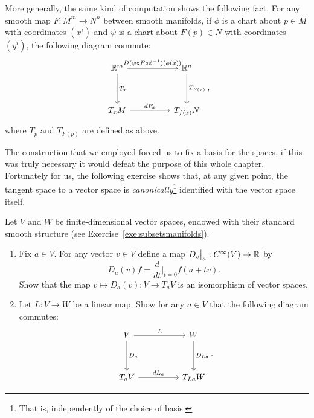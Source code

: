 More generally, the same kind of computation shows the following fact. For any smooth map $F:M^m \to N^n$ between smooth manifolds, if $\phi$ is a chart about $p\in M$ with coordinates $(x^i)$ and $\psi$ is a chart about $F(p)\in N$ with coordinates $(y^i)$, the following diagram commute:
\begin{equation}
    \begin{tikzcd}[row sep=huge, column sep=huge]
        \R^m \arrow[r, "D(\psi \circ F \circ \phi^{-1})(\phi(x))"] \arrow[d, "T_x"]
        & \R^n \arrow[d, "T_{F(x)}"] \\
        T_xM \arrow[r, "dF_x"]
        & T_{f(x)}N
    \end{tikzcd},
\end{equation}
where $T_p$ and $T_{F(p)}$ are defined as above.

The construction that we employed forced us to fix a basis for the spaces, if this was truly necessary it would defeat the purpose of this whole chapter.
Fortunately for us, the following exercise shows that, at any given point, the tangent space to a vector space is \emph{canonically}\footnote{That is, independently of the choice of basis.} identified with the vector space itself.

\begin{exe}
    Let $V$ and $W$ be finite-dimensional vector spaces, endowed with their standard smooth structure (see Exercise~\ref{exe:subsetsmanifolds}).
    \begin{enumerate}
        \item Fix $a\in V$. For any vector $v\in V$ define a map $D_v\big|_a : C^\infty(V) \to \mathbb{R}$ by
        \begin{equation}
            D_a(v) f = \frac{d}{dt}\Big|_{t=0} f(a + tv).
        \end{equation}
        Show that the map $v\mapsto D_a(v) : V \to T_aV$ is an isomorphism of vector spaces.
        \item Let $L:V\to W$ be a linear map. Show for any $a\in V$ that the following diagram commutes:
        \begin{equation}
        \begin{tikzcd}[row sep=huge, column sep=huge]
            V \arrow[r, "L"] \arrow[d, "D_a"]
            & W \arrow[d, "D_{La}"] \\
            T_aV \arrow[r, "dL_a"]
            & T_{La}W
        \end{tikzcd}.
    \end{equation}
    \end{enumerate}
\end{exe}

